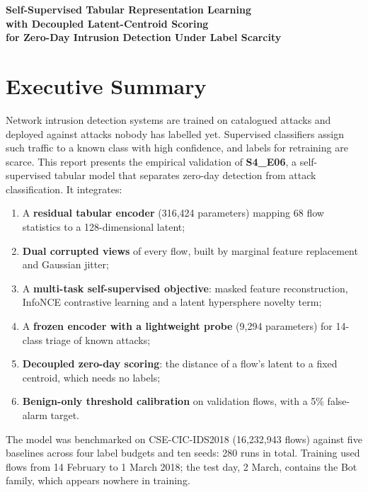 \documentclass[10pt,a4paper]{article}
\begin{document}
\begin{center}{\LARGE\bfseries Self-Supervised Tabular Representation Learning\\ with Decoupled Latent-Centroid Scoring\\ for Zero-Day Intrusion Detection Under Label Scarcity\par}\end{center}
\begin{center}\vspace{-4pt}{\largeTechnical Research Report \& Empirical Validation}\end{center}
\begin{center}\end{center}
\vspace{2pt}
\section*{Executive Summary}
Network intrusion detection systems are trained on catalogued attacks and deployed against attacks nobody has labelled yet. Supervised classifiers assign such traffic to a known class with high confidence, and labels for retraining are scarce. This report presents the empirical validation of \textbf{S4\_E06}, a self-supervised tabular model that separates zero-day detection from attack classification. It integrates:

\begin{enumerate}
\item A \textbf{residual tabular encoder} (316,424 parameters) mapping 68 flow statistics to a 128-dimensional latent;
\item \textbf{Dual corrupted views} of every flow, built by marginal feature replacement and Gaussian jitter;
\item A \textbf{multi-task self-supervised objective}: masked feature reconstruction, InfoNCE contrastive learning and a latent hypersphere novelty term;
\item A \textbf{frozen encoder with a lightweight probe} (9,294 parameters) for 14-class triage of known attacks;
\item \textbf{Decoupled zero-day scoring}: the distance of a flow's latent to a fixed centroid, which needs no labels;
\item \textbf{Benign-only threshold calibration} on validation flows, with a 5\% false-alarm target.
\end{enumerate}
The model was benchmarked on CSE-CIC-IDS2018 (16,232,943 flows) against five baselines across four label budgets and ten seeds: 280 runs in total. Training used flows from 14 February to 1 March 2018; the test day, 2 March, contains the Bot family, which appears nowhere in training.
\end{document}
